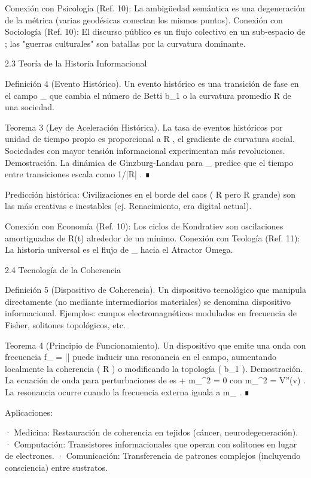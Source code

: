 \documentclass[12pt,twoside]{book}
\begin{document}
Conexión con Psicología (Ref. 10): La ambigüedad semántica es una degeneración de la métrica (varias geodésicas conectan los mismos puntos).
Conexión con Sociología (Ref. 10): El discurso público es un flujo colectivo en un sub-espacio de   ; las "guerras culturales" son batallas por la curvatura dominante.

2.3 Teoría de la Historia Informacional

Definición 4 (Evento Histórico). Un evento histórico es una transición de fase en el campo  \rho_{}  que cambia el número de Betti  b_1  o la curvatura promedio  R  de una sociedad.

Teorema 3 (Ley de Aceleración Histórica). La tasa de eventos históricos por unidad de tiempo propio es proporcional a  \nabla R , el gradiente de curvatura social. Sociedades con mayor tensión informacional experimentan más revoluciones.
Demostración. La dinámica de Ginzburg-Landau para  \rho_{}  predice que el tiempo entre transiciones escala como  1/|\nabla R| . ∎

Predicción histórica: Civilizaciones en el borde del caos ( R   pero  \nabla R  grande) son las más creativas e inestables (ej. Renacimiento, era digital actual).

Conexión con Economía (Ref. 10): Los ciclos de Kondratiev son oscilaciones amortiguadas de  R(t)  alrededor de un mínimo.
Conexión con Teología (Ref. 11): La historia universal es el flujo de  \rho_{}  hacia el Atractor Omega.

2.4 Tecnología de la Coherencia

Definición 5 (Dispositivo de Coherencia). Un dispositivo tecnológico que manipula  \rho  directamente (no mediante intermediarios materiales) se denomina dispositivo informacional. Ejemplos: campos electromagnéticos modulados en frecuencia de Fisher, solitones topológicos, etc.

Teorema 4 (Principio de Funcionamiento). Un dispositivo que emite una onda con frecuencia  f_{} =  |\nabla \ln \rho|  puede inducir una resonancia en el campo, aumentando localmente la coherencia ( R ) o modificando la topología ( b_1 ).
Demostración. La ecuación de onda para perturbaciones de  \rho  es  \square \delta\rho + m_{}^2 \delta\rho = 0  con  m_{}^2 = V''(v) . La resonancia ocurre cuando la frecuencia externa iguala a  m_{} . ∎

Aplicaciones:

· Medicina: Restauración de coherencia en tejidos (cáncer, neurodegeneración).
· Computación: Transistores informacionales que operan con solitones en lugar de electrones.
· Comunicación: Transferencia de patrones complejos (incluyendo consciencia) entre sustratos.
\end{document}
